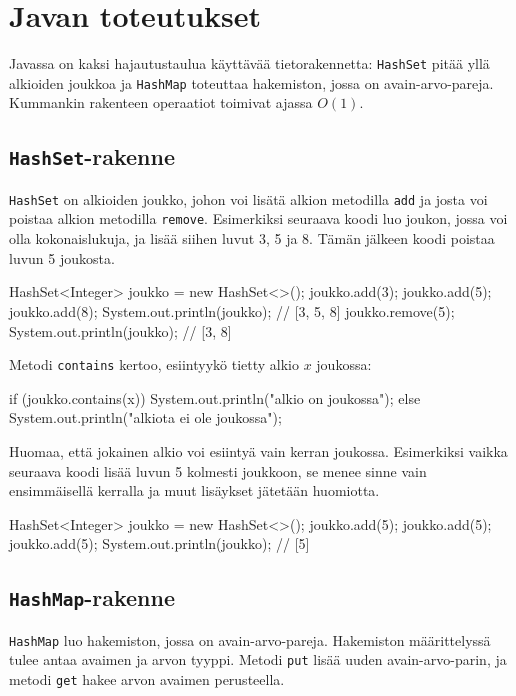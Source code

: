 \section{Javan toteutukset}

Javassa on kaksi hajautustaulua käyttävää tietorakennetta:
\texttt{HashSet} pitää yllä alkioiden joukkoa
ja \texttt{HashMap} toteuttaa
hakemiston, jossa on avain-arvo-pareja.
Kummankin rakenteen operaatiot toimivat ajassa $O(1)$.

\subsection{\texttt{HashSet}-rakenne}

\texttt{HashSet} on alkioiden joukko,
johon voi lisätä alkion metodilla \texttt{add}
ja josta voi poistaa alkion metodilla \texttt{remove}.
Esimerkiksi seuraava koodi luo joukon, jossa voi olla
kokonaislukuja, ja lisää siihen luvut 3, 5 ja 8.
Tämän jälkeen koodi poistaa luvun 5 joukosta.

\begin{code}
HashSet<Integer> joukko = new HashSet<>();
joukko.add(3);
joukko.add(5);
joukko.add(8);
System.out.println(joukko); // [3, 5, 8]
joukko.remove(5);
System.out.println(joukko); // [3, 8]
\end{code}

Metodi \texttt{contains} kertoo, esiintyykö tietty alkio $x$ joukossa:

\begin{code}
if (joukko.contains(x)) {
    System.out.println("alkio on joukossa");
} else {
    System.out.println("alkiota ei ole joukossa");
}
\end{code}

Huomaa, että jokainen alkio voi esiintyä vain kerran joukossa.
Esimerkiksi vaikka seuraava koodi lisää luvun 5 kolmesti
joukkoon, se menee sinne vain ensimmäisellä kerralla ja
muut lisäykset jätetään huomiotta.

\begin{code}
HashSet<Integer> joukko = new HashSet<>();
joukko.add(5);
joukko.add(5);
joukko.add(5);
System.out.println(joukko); // [5]
\end{code}

\subsection{\texttt{HashMap}-rakenne}

\texttt{HashMap} luo hakemiston,
jossa on avain-arvo-pareja.
Hakemiston määrit\-telyssä tulee antaa
avaimen ja arvon tyyppi.
Metodi \texttt{put} lisää uuden avain-arvo-parin,
ja metodi \texttt{get} hakee arvon avaimen perusteella.


